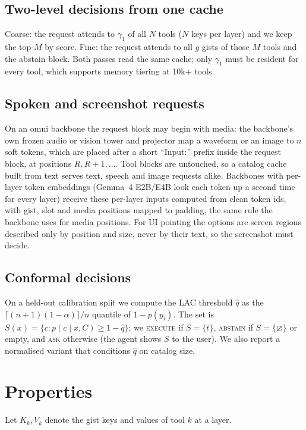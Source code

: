 \documentclass[sigconf,review,anonymous]{acmart}
\begin{document}
\subsection{Two-level decisions from one cache}\label{sec:two}
Coarse: the request attends to $\gamma_1$ of all $N$ tools ($N$ keys per layer) and we keep the top-$M$ by score.
Fine: the request attends to all $g$ gists of those $M$ tools and the abstain block.
Both passes read the same cache; only $\gamma_1$ must be resident for every tool, which supports memory tiering at 10k+ tools.

\subsection{Spoken and screenshot requests}\label{sec:mm}
On an omni backbone the request block may begin with media: the backbone's own frozen audio or vision tower and projector map a waveform or an image to $n$ soft tokens, which are placed after a short ``Input:'' prefix inside the request block, at positions $R, R{+}1, \dots$.
Tool blocks are untouched, so a catalog cache built from text serves text, speech and image requests alike.
Backbones with per-layer token embeddings (Gemma~4 E2B/E4B look each token up a second time for every layer) receive these per-layer inputs computed from clean token ids, with gist, slot and media positions mapped to padding, the same rule the backbone uses for media positions.
For UI pointing the options are screen regions described only by position and size, never by their text, so the screenshot must decide.

\subsection{Conformal decisions}\label{sec:conf}
On a held-out calibration split we compute the LAC threshold $\hat q$ as the $\lceil (n{+}1)(1{-}\alpha)\rceil/n$ quantile of $1-p(y_i)$.
The set is $S(x)=\{c: p(c\mid x,C)\ge 1-\hat q\}$; we \textsc{execute} if $S=\{t\}$, \textsc{abstain} if $S=\{\varnothing\}$ or empty, and \textsc{ask} otherwise (the agent shows $S$ to the user).
We also report a normalised variant that conditions $\hat q$ on catalog size.

\section{Properties}\label{sec:props}
Let $K_k, V_k$ denote the gist keys and values of tool $k$ at a layer.
\end{document}
